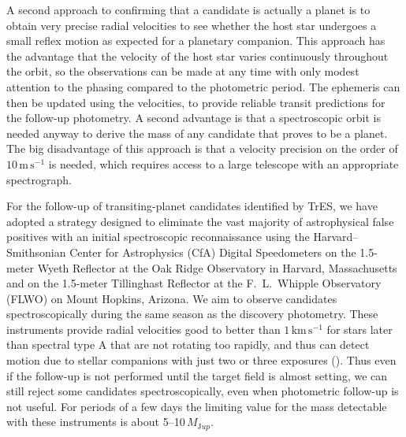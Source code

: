 A second approach to confirming that a candidate is actually a planet is to obtain very precise radial velocities to see whether the host star undergoes a small reflex motion as expected for a planetary companion. This approach has the advantage that the velocity of the host star varies continuously throughout the orbit, so the observations can be made at any time with only modest attention to the phasing compared to the photometric period.  The ephemeris can then be updated using the velocities, to provide reliable transit predictions for the follow-up photometry. A second advantage is that a spectroscopic orbit is needed anyway to derive the mass of any candidate that proves to be a planet.  The big disadvantage of this approach is that a velocity precision on the order of $10\,\mathrm{m\,s^{-1}}$ is needed, which requires access to a large telescope with an appropriate spectrograph.

For the follow-up of transiting-planet candidates identified by TrES, we have adopted a strategy designed to eliminate the vast majority of astrophysical false positives with an initial spectroscopic reconnaissance using the Harvard--Smithsonian Center for Astrophysics (CfA) Digital Speedometers \citep{Latham:ASP:1992a} on the 1.5-meter Wyeth Reflector at the Oak Ridge Observatory in Harvard, Massachusetts and on the 1.5-meter Tillinghast Reflector at the F.~L.~Whipple Observatory (FLWO) on Mount Hopkins, Arizona. We aim to observe candidates spectroscopically during the same season as the discovery photometry. These instruments provide radial velocities good to better than $1\,\mathrm{km\,s^{-1}}$ for stars later than spectral type A that are not rotating too rapidly, and thus can detect motion due to stellar companions with just two or three exposures (\citealp[see, e.g.,][]{Latham:ASP:2003a, Charbonneau_Brown_Dunham:AIP:2004a}). Thus even if the follow-up is not performed until the target field is almost setting, we can still reject some candidates spectroscopically, even when photometric follow-up is not useful. For periods of a few days the limiting value for the mass detectable with these instruments is about 5--10\,$M_{\mathrm Jup}$.

